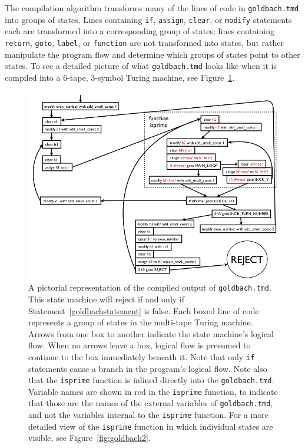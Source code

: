 \documentclass[11pt]{report}
\begin{document}
The compilation algorithm transforms many of the lines of code in \texttt{goldbach.tmd} into groups of states. Lines containing \texttt{if}, \texttt{assign}, \texttt{clear}, or \texttt{modify} statements each are transformed into a corresponding group of states; lines containing \texttt{return}, \texttt{goto}, \texttt{label}, or \texttt{function} are not transformed into states, but rather manipulate the program flow and determine which groups of states point to other states. To see a detailed picture of what \texttt{goldbach.tmd} looks like when it is compiled into a 6-tape, 3-symbol Turing machine, see Figure~\ref{fig:goldbach1}.

\begin{figure} 
\begin{center} 
\includegraphics[scale=0.4]{figs/goldbach1.png} 
\caption{A pictorial representation of the compiled output of \texttt{goldbach.tmd}. This state machine will reject if and only if Statement~\ref{goldbachstatement} is false. Each boxed line of code represents a group of states in the multi-tape Turing machine. Arrows from one box to another indicate the state machine's logical flow. When no arrows leave a box, logical flow is presumed to continue to the box immediately beneath it. Note that only \texttt{if} statements cause a branch in the program's logical flow. Note also that the \texttt{isprime} function is inlined directly into the \texttt{goldbach.tmd}. Variable names are shown in red in the \texttt{isprime} function, to indicate that those are the names of the external variables of \texttt{goldbach.tmd}, and not the variables internal to the \texttt{isprime} function. For a more detailed view of the \texttt{isprime} function in which individual states are visible, see Figure~\ref{fig:goldbach2}. \label{fig:goldbach1}}
\end{center} 
\end{figure}
\end{document}
